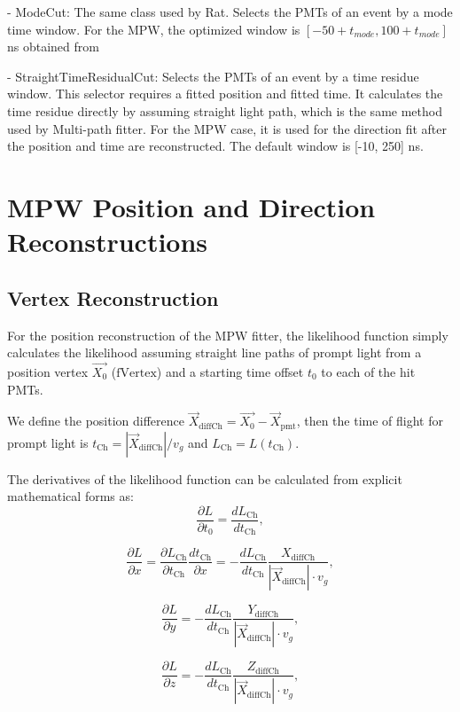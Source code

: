 	- ModeCut: The same class used by Rat. Selects the PMTs of an event by a mode time window. For the MPW, the optimized window is $[-50 + t_{mode}, 100 + t_{mode}]$ ns obtained from %
	
	- StraightTimeResidualCut: Selects the PMTs of an event by a time residue window. This selector requires a fitted position and fitted time. It calculates the time residue directly by assuming straight light path, which is the same method used by Multi-path fitter. For the MPW case, it is used for the direction fit after the position and time are reconstructed. The default window is [-10, 250] ns.

\section{MPW Position and Direction Reconstructions}


\subsection{Vertex Reconstruction}
For the position reconstruction of the MPW fitter, the likelihood function simply calculates the likelihood assuming straight line paths of prompt light from a position vertex $\vec{X_0}$ ($\mathrm{fVertex}$) and a starting time offset $t_0$ to each of the hit PMTs. 

We define the position difference $\vec{X}_{{\mathrm{diffCh}}} = \vec{X_0}-\vec{X}_{\mathrm{pmt}}$, then the time of flight for prompt light is  $t_{\mathrm{Ch}}=|\vec{X}_{{\mathrm{diffCh}}}|/v_g$ and $L_{\mathrm{Ch}}=L(t_{\mathrm{Ch}})$.

The derivatives of the likelihood function can be calculated from explicit mathematical forms as:
\[
\frac{\partial L}{\partial t_0}=\frac{dL_{\mathrm{Ch}}}{dt_{\mathrm{Ch}}},
\]

\[
\frac{\partial L}{\partial x}=\frac{\partial L_{\mathrm{Ch}}}{\partial t_{\mathrm{Ch}}}\frac{dt_{\mathrm{Ch}}}{\partial x}=-\frac{dL_{\mathrm{Ch}}}{dt_{\mathrm{Ch}}}\frac{X_{{\mathrm{diffCh}}}}{|\vec{X}_{{\mathrm{diffCh}}}|\cdot v_g},
\]

\[
\frac{\partial L}{\partial y}=-\frac{dL_{\mathrm{Ch}}}{dt_{\mathrm{Ch}}}\frac{Y_{{\mathrm{diffCh}}}}{|\vec{X}_{{\mathrm{diffCh}}}|\cdot v_g},
\]

\[
\frac{\partial L}{\partial z}=-\frac{dL_{\mathrm{Ch}}}{dt_{\mathrm{Ch}}}\frac{Z_{{\mathrm{diffCh}}}}{|\vec{X}_{{\mathrm{diffCh}}}|\cdot v_g},
\]

